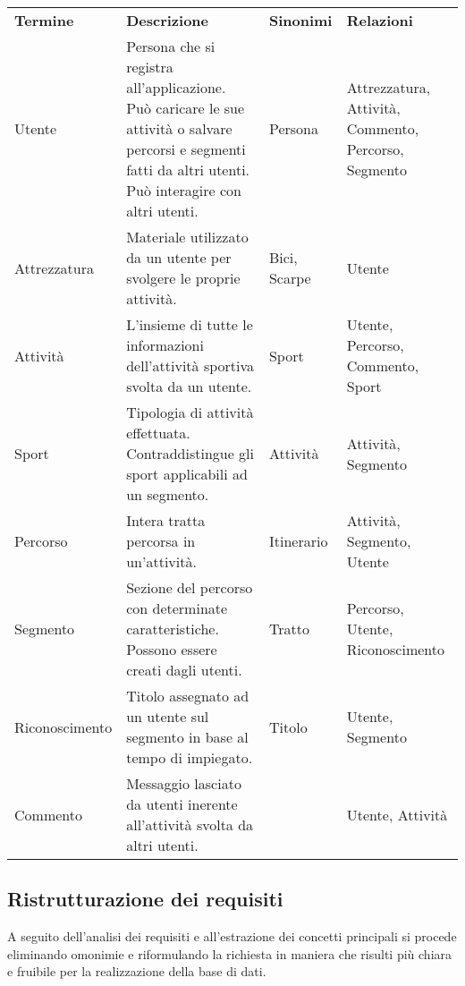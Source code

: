 \documentclass[12pt]{report}
\begin{document}
\begin{table}[h!]
    \centering
    \renewcommand{\arraystretch}{1.4} %
    \begin{tabularx}{\textwidth}{
        >{\raggedright\arraybackslash}p{}%
        >{\raggedright\arraybackslash}p{}%
        >{\raggedright\arraybackslash}p{}%
        >{\raggedright\arraybackslash}p{}%
        }
    \arrayrulecolor[HTML]{BDBFC3}
    \rowcolor[HTML]{DFF8FE} 
    \textbf{Termine} & \textbf{Descrizione} & \textbf{Sinonimi} & \textbf{Relazioni} \\
    Utente & Persona che si registra all'applicazione. Può caricare le sue attività o salvare percorsi e segmenti fatti da altri utenti. Può interagire con altri utenti. & Persona & Attrezzatura, Attività, Commento, Percorso, Segmento\\ \hline
    Attrezzatura & Materiale utilizzato da un utente per svolgere le proprie attività. & Bici, Scarpe & Utente \\ \hline 
	Attività & L'insieme di tutte le informazioni dell'attività sportiva svolta da un utente. & Sport & Utente, Percorso, Commento, Sport\\ \hline
    Sport & Tipologia di attività effettuata. Contraddistingue gli sport applicabili ad un segmento. & Attività & Attività, Segmento\\ \hline
    Percorso & Intera tratta percorsa in un'attività. & Itinerario & Attività, Segmento, Utente\\ \hline
    Segmento & Sezione del percorso con determinate caratteristiche. Possono essere creati dagli utenti. & Tratto & Percorso, Utente, Riconoscimento \\ \hline
    Riconoscimento & Titolo assegnato ad un utente sul segmento in base al tempo di impiegato. & Titolo & Utente, Segmento\\ \hline
	Commento & Messaggio lasciato da utenti inerente all'attività svolta da altri utenti. & & Utente, Attività \\
    \end{tabularx}
\end{table}

\subsection*{Ristrutturazione dei requisiti}
A seguito dell'analisi dei requisiti e all'estrazione dei concetti principali si procede eliminando omonimie e
riformulando la richiesta in maniera che risulti più chiara e fruibile per la realizzazione della base di dati.
\end{document}
